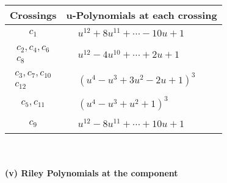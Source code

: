 \documentclass[1p]{elsarticle_modified}
\theoremstyle{definition}
\begin{document}
\begin{tabular}{m{50pt}|m{274pt}}
Crossings & \hspace{64pt}u-Polynomials at each crossing \\
\hline $$\begin{aligned}c_{1}\end{aligned}$$&$\begin{aligned}
&u^{12}+8 u^{11}+\cdots-10 u+1
\end{aligned}$\\
\hline $$\begin{aligned}c_{2},c_{4},c_{6}\\c_{8}\end{aligned}$$&$\begin{aligned}
&u^{12}-4 u^{10}+\cdots+2 u+1
\end{aligned}$\\
\hline $$\begin{aligned}c_{3},c_{7},c_{10}\\c_{12}\end{aligned}$$&$\begin{aligned}
&(u^4- u^3+3 u^2-2 u+1)^3
\end{aligned}$\\
\hline $$\begin{aligned}c_{5},c_{11}\end{aligned}$$&$\begin{aligned}
&(u^4- u^3+u^2+1)^3
\end{aligned}$\\
\hline $$\begin{aligned}c_{9}\end{aligned}$$&$\begin{aligned}
&u^{12}-8 u^{11}+\cdots+10 u+1
\end{aligned}$\\
\hline
\end{tabular}\\~\\
\newpage\renewcommand{\arraystretch}{1}
\flushleft \textbf{(v) Riley Polynomials at the component}\newline \\
\end{document}

